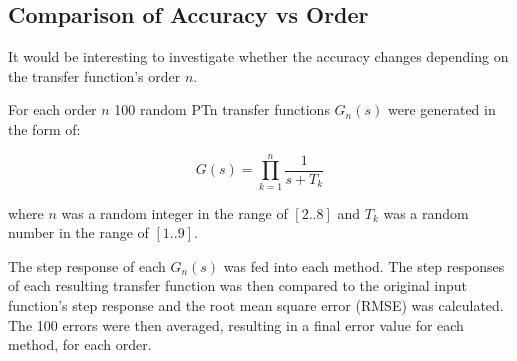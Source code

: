 \subsection{Comparison of Accuracy vs Order}

It would be interesting to investigate whether the accuracy changes depending on
the transfer function's order $n$.

For each  order $n$ 100 random PTn transfer functions $G_n(s)$ were generated in
the form of:

\begin{equation}
    G(s) = \prod_{k=1}^n \frac{1}{s+T_k}
    \label{eq:random_ptn}
\end{equation}

where $n$ was a random integer in  the  range of $[2..8]$ and $T_k$ was a random
number in the range of $[1..9]$.

The step response of each $G_n(s)$  was fed into each method. The step responses
of each resulting transfer  function  was  then  compared  to the original input
function's step  response  and the root mean square error (RMSE) was calculated.
The  100 errors were then averaged, resulting in a final error  value  for  each
method, for each order.

